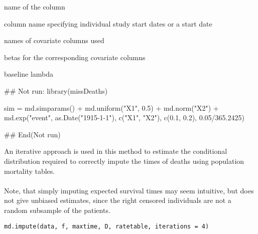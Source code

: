 \documentclass[a4paper]{book}
\begin{document}
%
\begin{Arguments}
\begin{ldescription}
\item[\code{name}] name of the column

\item[\code{startcol}] column name specifying individual study start dates or a start date

\item[\code{covariates}] names of covariate columns used

\item[\code{betas}] betas for the corresponding covariate columns

\item[\code{lambda}] baseline lambda
\end{ldescription}
\end{Arguments}
%
\begin{Examples}
\begin{ExampleCode}

## Not run: 
library(missDeaths)

sim = md.simparams() +
  md.uniform("X1", 0.5) + 
    md.norm("X2") +
      md.exp("event", as.Date("1915-1-1"), c("X1", "X2"), c(0.1, 0.2), 0.05/365.2425)

## End(Not run)

\end{ExampleCode}
\end{Examples}
%
\begin{Description}\relax
An iterative approach is used in this method to estimate the conditional
distribution required to correctly impute the times of deaths using
population mortality tables.\\{}\\{}
Note, that simply imputing expected survival times may seem intuitive, 
but does not give unbiased estimates, since the right censored individuals 
are not a random subsample of the patients.
\end{Description}
%
\begin{Usage}
\begin{verbatim}
md.impute(data, f, maxtime, D, ratetable, iterations = 4)
\end{verbatim}
\end{Usage}
%
\end{document}
